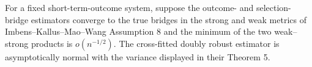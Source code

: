 For a fixed short-term-outcome system, suppose the outcome- and selection-bridge estimators converge to the true bridges in the strong and weak metrics of Imbens--Kallus--Mao--Wang Assumption 8 and the minimum of the two weak--strong products is \(o(n^{-1/2})\).  The cross-fitted doubly robust estimator is asymptotically normal with the variance displayed in their Theorem 5.